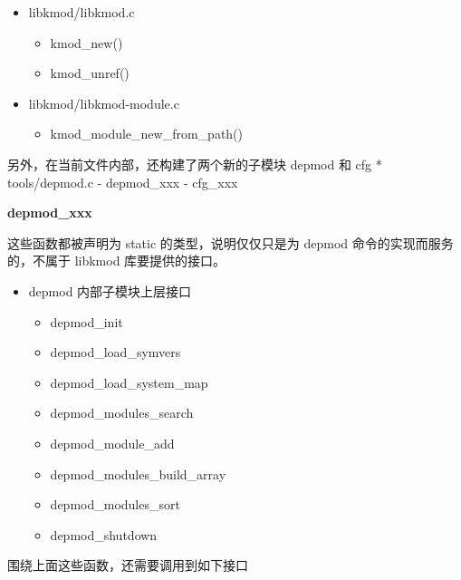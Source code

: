 \begin{itemize}
\item
  libkmod/libkmod.c
  \begin{itemize}
  \item
    kmod\_new()
  \item
    kmod\_unref()
  \end{itemize}
\item
  libkmod/libkmod-module.c
  \begin{itemize}
  \item
    kmod\_module\_new\_from\_path()
  \end{itemize}
\end{itemize}
另外，在当前文件内部，还构建了两个新的子模块 depmod 和 cfg *
tools/depmod.c - depmod\_xxx - cfg\_xxx

\textbf{depmod\_xxx}

这些函数都被声明为 static 的类型，说明仅仅只是为 depmod
命令的实现而服务的，不属于 libkmod 库要提供的接口。

\begin{itemize}
\item
  depmod 内部子模块上层接口
  \begin{itemize}
  \item
    depmod\_init
  \item
    depmod\_load\_symvers
  \item
    depmod\_load\_system\_map
  \item
    depmod\_modules\_search
  \item
    depmod\_module\_add
  \item
    depmod\_modules\_build\_array
  \item
    depmod\_modules\_sort
  \item
    depmod\_shutdown
  \end{itemize}
\end{itemize}
围绕上面这些函数，还需要调用到如下接口

